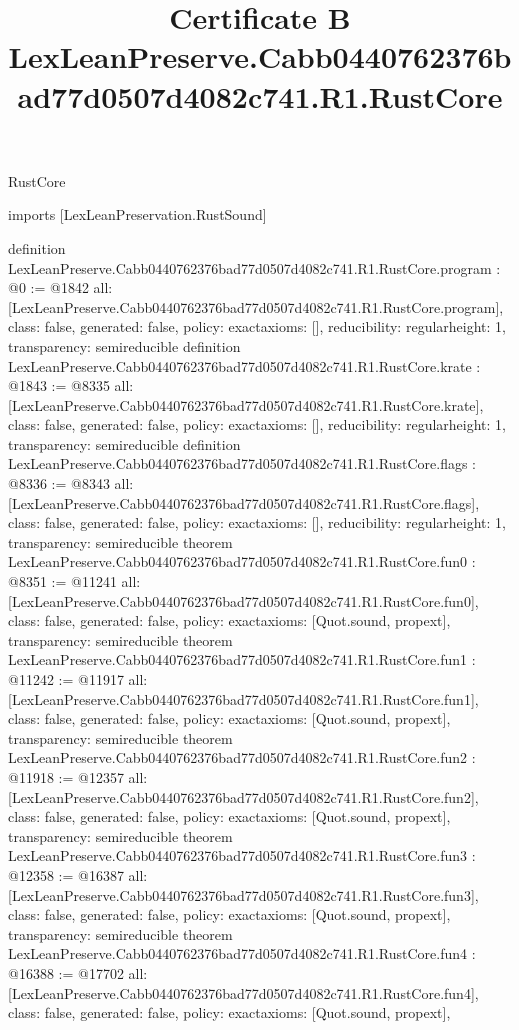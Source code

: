 \begin{lexlean}{RustCore}
\title{Certificate B LexLeanPreserve.Cabb0440762376bad77d0507d4082c741.R1.RustCore}
\begin{coremodule}
imports [LexLeanPreservation.RustSound]

definition LexLeanPreserve.Cabb0440762376bad77d0507d4082c741.R1.RustCore.program : @0 := @1842 {
  all: [LexLeanPreserve.Cabb0440762376bad77d0507d4082c741.R1.RustCore.program],
  class: false,
  generated: false,
  policy: exact{axioms: []},
  reducibility: regular{height: 1},
  transparency: semireducible
}
definition LexLeanPreserve.Cabb0440762376bad77d0507d4082c741.R1.RustCore.krate : @1843 := @8335 {
  all: [LexLeanPreserve.Cabb0440762376bad77d0507d4082c741.R1.RustCore.krate],
  class: false,
  generated: false,
  policy: exact{axioms: []},
  reducibility: regular{height: 1},
  transparency: semireducible
}
definition LexLeanPreserve.Cabb0440762376bad77d0507d4082c741.R1.RustCore.flags : @8336 := @8343 {
  all: [LexLeanPreserve.Cabb0440762376bad77d0507d4082c741.R1.RustCore.flags],
  class: false,
  generated: false,
  policy: exact{axioms: []},
  reducibility: regular{height: 1},
  transparency: semireducible
}
theorem LexLeanPreserve.Cabb0440762376bad77d0507d4082c741.R1.RustCore.fun0 : @8351 := @11241 {
  all: [LexLeanPreserve.Cabb0440762376bad77d0507d4082c741.R1.RustCore.fun0],
  class: false,
  generated: false,
  policy: exact{axioms: [Quot.sound, propext]},
  transparency: semireducible
}
theorem LexLeanPreserve.Cabb0440762376bad77d0507d4082c741.R1.RustCore.fun1 : @11242 := @11917 {
  all: [LexLeanPreserve.Cabb0440762376bad77d0507d4082c741.R1.RustCore.fun1],
  class: false,
  generated: false,
  policy: exact{axioms: [Quot.sound, propext]},
  transparency: semireducible
}
theorem LexLeanPreserve.Cabb0440762376bad77d0507d4082c741.R1.RustCore.fun2 : @11918 := @12357 {
  all: [LexLeanPreserve.Cabb0440762376bad77d0507d4082c741.R1.RustCore.fun2],
  class: false,
  generated: false,
  policy: exact{axioms: [Quot.sound, propext]},
  transparency: semireducible
}
theorem LexLeanPreserve.Cabb0440762376bad77d0507d4082c741.R1.RustCore.fun3 : @12358 := @16387 {
  all: [LexLeanPreserve.Cabb0440762376bad77d0507d4082c741.R1.RustCore.fun3],
  class: false,
  generated: false,
  policy: exact{axioms: [Quot.sound, propext]},
  transparency: semireducible
}
theorem LexLeanPreserve.Cabb0440762376bad77d0507d4082c741.R1.RustCore.fun4 : @16388 := @17702 {
  all: [LexLeanPreserve.Cabb0440762376bad77d0507d4082c741.R1.RustCore.fun4],
  class: false,
  generated: false,
  policy: exact{axioms: [Quot.sound, propext]},
}
\end{coremodule}
\end{lexlean}
